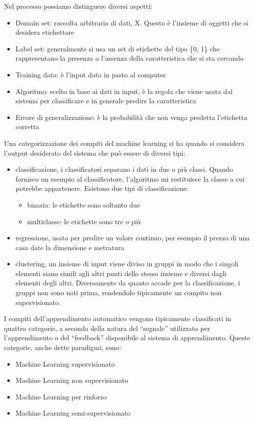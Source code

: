 \documentclass[12pt,italian]{report}
\begin{document}
Nel processo possiamo distinguere diversi aspetti:
\begin{itemize}
	\item Domain set: raccolta arbitraria di dati, X. Questo è l'insieme di oggetti che si desidera etichettare
	\item Label set: generalmente si usa un set di etichette del tipo \{0, 1\} che rappresentano la presenza o l'assenza della caratteristica che si sta cercando
	\item Training data: è l'input dato in pasto al computer
	\item Algoritmo: scelto in base ai dati in input, è la regola che viene usata dal sistema per classificare e in generale predire la caratteristica
	\item Errore di generalizzazione: è la probabilità che non venga predetta l'etichetta corretta 
\end{itemize}
Una categorizzazione dei compiti del machine learning si ha quando si considera l'output desiderato del sistema che può essere di diversi tipi:
\begin{itemize}
	\item classificazione, i classificatori separano i dati in due o più classi. Quando fornisco un esempio al classificatore, l'algoritmo mi restituisce la classe a cui potrebbe appartenere.
	Esistono due tipi di classificazione:
	\begin{itemize}
		\item binaria: le etichette sono soltanto due
		\item multiclasse: le etichette sono tre o più
	\end{itemize}
	\item regressione, usata per predire un valore continuo, per esempio il prezzo di una casa date la dimensione e metratura
	\item clustering, un insieme di input viene diviso in gruppi in modo che i singoli elementi siano simili agli altri punti dello stesso insieme e diversi dagli elementi degli altri. Diversamente da quanto accade per la classificazione, i gruppi non sono noti prima, rendendolo tipicamente un compito non supervisionato.
\end{itemize}
I compiti dell'apprendimento automatico vengono tipicamente classificati in quattro categorie, a seconda della natura del ``segnale'' utilizzato per l'apprendimento o del ``feedback'' disponibile al sistema di apprendimento. Queste categorie, anche dette paradigmi, sono:
\begin{itemize}
	\item Machine Learning supervisionato
	\item Machine Learning non supervisionato
	\item Machine Learning per rinforzo
	\item Machine Learning semi-supervisionato
	
\end{itemize}
\end{document}
